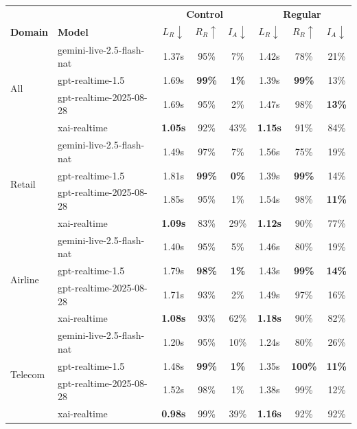 \begin{tabular}{@{}ll|ccc|ccc@{}}
\toprule
 & & \multicolumn{3}{c|}{\textbf{Control}} & \multicolumn{3}{c}{\textbf{Regular}} \\
\textbf{Domain} & \textbf{Model} & $L_R\downarrow$ & $R_R\uparrow$ & $I_A\downarrow$ & $L_R\downarrow$ & $R_R\uparrow$ & $I_A\downarrow$ \\
\midrule
\multirow{4}{*}{All} & gemini-live-2.5-flash-nat & 1.37s & 95\% & 7\% & 1.42s & 78\% & 21\% \\
 & gpt-realtime-1.5 & 1.69s & \textbf{99\%} & \textbf{1\%} & 1.39s & \textbf{99\%} & 13\% \\
 & gpt-realtime-2025-08-28 & 1.69s & 95\% & 2\% & 1.47s & 98\% & \textbf{13\%} \\
 & xai-realtime & \textbf{1.05s} & 92\% & 43\% & \textbf{1.15s} & 91\% & 84\% \\
\midrule
\multirow{4}{*}{Retail} & gemini-live-2.5-flash-nat & 1.49s & 97\% & 7\% & 1.56s & 75\% & 19\% \\
 & gpt-realtime-1.5 & 1.81s & \textbf{99\%} & \textbf{0\%} & 1.39s & \textbf{99\%} & 14\% \\
 & gpt-realtime-2025-08-28 & 1.85s & 95\% & 1\% & 1.54s & 98\% & \textbf{11\%} \\
 & xai-realtime & \textbf{1.09s} & 83\% & 29\% & \textbf{1.12s} & 90\% & 77\% \\
\midrule
\multirow{4}{*}{Airline} & gemini-live-2.5-flash-nat & 1.40s & 95\% & 5\% & 1.46s & 80\% & 19\% \\
 & gpt-realtime-1.5 & 1.79s & \textbf{98\%} & \textbf{1\%} & 1.43s & \textbf{99\%} & \textbf{14\%} \\
 & gpt-realtime-2025-08-28 & 1.71s & 93\% & 2\% & 1.49s & 97\% & 16\% \\
 & xai-realtime & \textbf{1.08s} & 93\% & 62\% & \textbf{1.18s} & 90\% & 82\% \\
\midrule
\multirow{4}{*}{Telecom} & gemini-live-2.5-flash-nat & 1.20s & 95\% & 10\% & 1.24s & 80\% & 26\% \\
 & gpt-realtime-1.5 & 1.48s & \textbf{99\%} & \textbf{1\%} & 1.35s & \textbf{100\%} & \textbf{11\%} \\
 & gpt-realtime-2025-08-28 & 1.52s & 98\% & 1\% & 1.38s & 99\% & 12\% \\
 & xai-realtime & \textbf{0.98s} & 99\% & 39\% & \textbf{1.16s} & 92\% & 92\% \\
\bottomrule
\end{tabular}